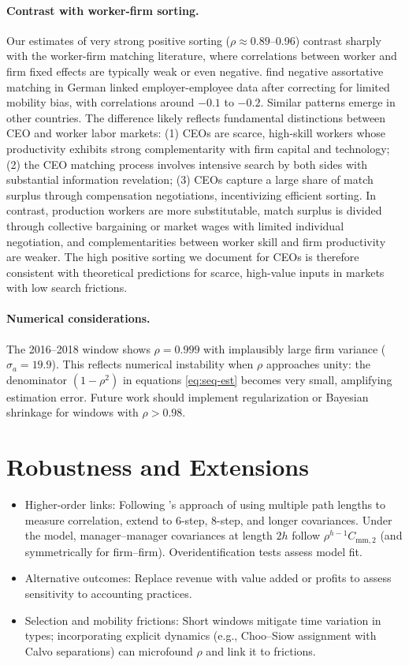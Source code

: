 \documentclass[11pt]{article}
\begin{document}
\paragraph{Contrast with worker-firm sorting.} Our estimates of very strong positive sorting ($\rho \approx 0.89$--0.96) contrast sharply with the worker-firm matching literature, where correlations between worker and firm fixed effects are typically weak or even negative. \citet{Andrews2008} find negative assortative matching in German linked employer-employee data after correcting for limited mobility bias, with correlations around $-0.1$ to $-0.2$. Similar patterns emerge in other countries. The difference likely reflects fundamental distinctions between CEO and worker labor markets: (1) CEOs are scarce, high-skill workers whose productivity exhibits strong complementarity with firm capital and technology; (2) the CEO matching process involves intensive search by both sides with substantial information revelation; (3) CEOs capture a large share of match surplus through compensation negotiations, incentivizing efficient sorting. In contrast, production workers are more substitutable, match surplus is divided through collective bargaining or market wages with limited individual negotiation, and complementarities between worker skill and firm productivity are weaker. The high positive sorting we document for CEOs is therefore consistent with theoretical predictions for scarce, high-value inputs in markets with low search frictions.

\paragraph{Numerical considerations.} The 2016--2018 window shows $\rho = 0.999$ with implausibly large firm variance ($\sigma_a = 19.9$). This reflects numerical instability when $\rho$ approaches unity: the denominator $(1-\rho^2)$ in equations \eqref{eq:seq-est} becomes very small, amplifying estimation error. Future work should implement regularization or Bayesian shrinkage for windows with $\rho > 0.98$.

\section{Robustness and Extensions}
\begin{itemize}
  \item Higher-order links: Following \citet{Clark2023}'s approach of using multiple path lengths to measure correlation, extend to 6-step, 8-step, and longer covariances. Under the model, manager--manager covariances at length $2h$ follow $\rho^{h-1} C_{\text{mm},2}$ (and symmetrically for firm--firm). Overidentification tests assess model fit.
  \item Alternative outcomes: Replace revenue with value added or profits to assess sensitivity to accounting practices.
  \item Selection and mobility frictions: Short windows mitigate time variation in types; incorporating explicit dynamics (e.g., Choo--Siow assignment with Calvo separations) can microfound $\rho$ and link it to frictions.
\end{itemize}
\end{document}
